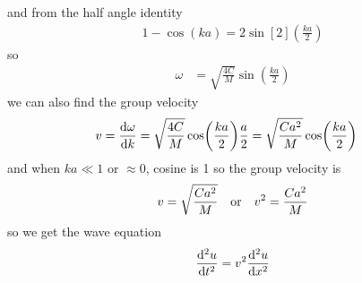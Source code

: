 \documentclass[../main.tex]{subfiles}
\begin{document}
and from the half angle identity
\begin{align*}
    1 - \cos(ka) = 2\sin[2](\frac{ka}{2})
\end{align*}
so 
\begin{align*}
    \omega &= \sqrt{\frac{4C}{M}}\sin(\frac{ka}{2})
\end{align*}
we can also find the group velocity
\begin{align*}
    v &= \dv{\omega}{k} = \sqrt{\frac{4C}{M}} \cos(\frac{ka}{2}) \frac{a}{2}
        = \sqrt{\frac{Ca^2}{M}} \cos(\frac{ka}{2})
\end{align*}
and when $ka \ll 1$ or $\approx 0$, cosine is 1 so the group velocity is
\begin{align*}
    v = \sqrt{\frac{Ca^2}{M}} \qor v^2 = \frac{Ca^2}{M}
\end{align*}
so we get the wave equation
\begin{align*}
    \dv[2]{u}{t} = v^2 \dv[2]{u}{x}
\end{align*}
\end{document}
